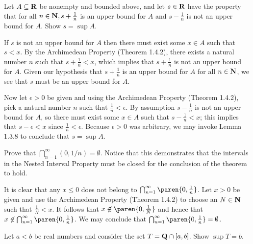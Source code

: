 \documentclass{lew98_solutions}
\begin{document}
\begin{exercise}
\label{ex:1.4.2}
    Let \( A \subseteq \mathbf{R} \) be nonempty and bounded above, and let \( s \in \mathbf{R} \) have the property that for all \( n \in \mathbf{N}, s + \tfrac{1}{n} \) is an upper bound for \( A \) and \( s - \tfrac{1}{n} \) is not an upper bound for \( A \). Show \( s = \sup A \).
\end{exercise}

\begin{solution}
    If \( s \) is not an upper bound for \( A \) then there must exist some \( x \in A \) such that \( s < x \). By the Archimedean Property (Theorem 1.4.2), there exists a natural number \( n \) such that \( s + \tfrac{1}{n} < x \), which implies that \( s + \tfrac{1}{n} \) is not an upper bound for \( A \). Given our hypothesis that \( s + \tfrac{1}{n} \) is an upper bound for \( A \) for all \( n \in \mathbf{N} \), we see that \( s \) must be an upper bound for \( A \).

    Now let \( \epsilon > 0 \) be given and using the Archimedean Property (Theorem 1.4.2), pick a natural number \( n \) such that \( \tfrac{1}{n} < \epsilon \). By assumption \( s - \tfrac{1}{n} \) is not an upper bound for \( A \), so there must exist some \( x \in A \) such that \( s - \tfrac{1}{n} < x \); this implies that \( s - \epsilon < x \) since \( \tfrac{1}{n} < \epsilon \). Because \( \epsilon > 0 \) was arbitrary, we may invoke Lemma 1.3.8 to conclude that \( s = \sup A \).
\end{solution}

\begin{exercise}
\label{ex:1.4.3}
    Prove that \( \bigcap_{n=1}^{\infty} (0, 1/n) = \emptyset \). Notice that this demonstrates that the intervals in the Nested Interval Property must be closed for the conclusion of the theorem to hold.
\end{exercise}

\begin{solution}
    It is clear that any \( x \leq 0 \) does not belong to \( \bigcap_{n=1}^{\infty} \paren{0, \tfrac{1}{n}} \). Let \( x > 0 \) be given and use the Archimedean Property (Theorem 1.4.2) to choose an \( N \in \mathbf{N} \) such that \( \tfrac{1}{N} < x \). It follows that \( x \not\in \paren{0, \tfrac{1}{N}} \) and hence that \( x \not\in \bigcap_{n=1}^{\infty} \paren{0, \tfrac{1}{n}} \). We may conclude that \( \bigcap_{n=1}^{\infty} \paren{0, \tfrac{1}{n}} = \emptyset \).
\end{solution}

\begin{exercise}
\label{ex:1.4.4}
    Let \( a < b \) be real numbers and consider the set \( T = \mathbf{Q} \cap [a, b] \). Show \( \sup T = b \).
\end{exercise}
\end{document}
